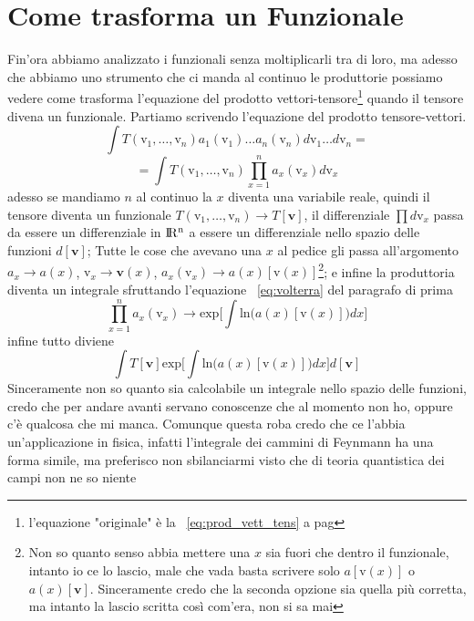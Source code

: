 \documentclass[11pt,a4paper]{report}
\newcommand{\vettore}[1]{\mathbf{#1}}
\newcommand{\vettorec}[1]{\textrm{#1}}
\theoremstyle{definition}
\theoremstyle{plain}
\theoremstyle{plain}
\begin{document}
		\section{Come trasforma un Funzionale}
			Fin'ora abbiamo analizzato i funzionali senza moltiplicarli tra di loro, ma adesso che abbiamo uno strumento che ci manda al continuo le produttorie possiamo vedere come trasforma l'equazione del prodotto vettori-tensore\footnote{l'equazione "originale" è la ~\ref{eq:prod_vett_tens} a pag \pageref{eq:prod_vett_tens}} quando il tensore divena un funzionale.\newline
			Partiamo scrivendo l'equazione del prodotto tensore-vettori.
			\begin{equation}
				\int T(\vettorec v_1,\dots,\vettorec v_n)a_1(\vettorec v_1)\dots a_n(\vettorec v_n)d\vettorec v_1\dots d\vettorec v_n=
			\end{equation}
			\[
				=\int T(\vettorec v_1,\dots,\vettorec v_n)\prod_{x=1}^n a_x(\vettorec v_x)d\vettorec v_x
			\]
			adesso se mandiamo $n$ al continuo la $x$ diventa una variabile reale, quindi il tensore diventa un funzionale $T(\vettorec v_1,\dots,\vettorec v_n)\rightarrow T[\vettore v]$, il differenziale $\prod d\vettorec v_x$ passa da essere un differenziale in $\rm I\!R^n$ a essere un differenziale nello spazio delle funzioni $d[\vettore v]$;\newline
			Tutte le cose che avevano una $x$ al pedice gli passa all'argomento $a_x\rightarrow a(x)$, $\vettorec v_x\rightarrow \vettore v(x)$, $a_x(\vettorec v_x)\rightarrow a(x)[\vettorec v(x)]$\footnote{Non so quanto senso abbia mettere una $x$ sia fuori che dentro il funzionale, intanto io ce lo lascio, male che vada basta scrivere solo $a[\vettorec v(x)]$ o $a(x)[\vettore v]$. Sinceramente credo che la seconda opzione sia quella più corretta, ma intanto la lascio scritta così com'era, non si sa mai}; e infine la produttoria diventa un integrale sfruttando l'equazione ~\ref{eq:volterra} del paragrafo di prima 
			\[
				\prod_{x=1}^n a_x(\vettorec v_x)\rightarrow\textrm{exp}\bigg[\int \textrm{ln}\big( a(x)[\vettorec v(x)]\big)dx\bigg]
			\]
			infine tutto diviene
			\begin{equation}
				\int T[\vettore v]\textrm{exp}\bigg[\int \textrm{ln}\big(a(x)[\vettorec v(x)]\big)dx\bigg]d[\vettore v]
			\end{equation}
			Sinceramente non so quanto sia calcolabile un integrale nello spazio delle funzioni, credo che per andare avanti servano conoscenze che al momento non ho, oppure c'è qualcosa che mi manca.\newline
			Comunque questa roba credo che ce l'abbia un'applicazione in fisica, infatti l'integrale dei cammini di Feynmann ha una forma simile, ma preferisco non sbilanciarmi visto che di teoria quantistica dei campi non ne so niente
\end{document}
